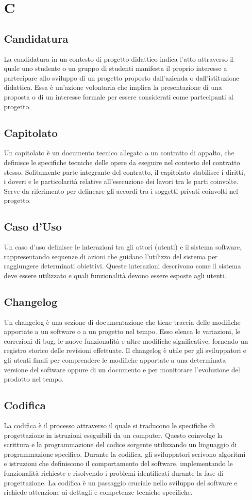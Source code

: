 \section{C} 
\subsection{Candidatura} 
La candidatura in un contesto di progetto didattico indica l'atto attraverso il quale uno studente o un gruppo di studenti manifesta il proprio interesse a partecipare allo sviluppo di un progetto proposto dall'azienda o dall'istituzione didattica. Essa è un'azione volontaria che implica la presentazione di una proposta o di un interesse formale per essere considerati come partecipanti al progetto.
\subsection{Capitolato} 
Un capitolato è un documento tecnico allegato a un contratto di appalto, che definisce le specifiche tecniche delle opere da eseguire nel contesto del contratto stesso. Solitamente parte integrante del contratto, il capitolato stabilisce i diritti, i doveri e le particolarità relative all'esecuzione dei lavori tra le parti coinvolte. Serve da riferimento per delineare gli accordi tra i soggetti privati coinvolti nel progetto.
\subsection{Caso d'Uso} 
Un caso d'uso definisce le interazioni tra gli attori (utenti) e il sistema software, rappresentando sequenze di azioni che guidano l'utilizzo del sistema per raggiungere determinati obiettivi. Queste interazioni descrivono come il sistema deve essere utilizzato e quali funzionalità devono essere esposte agli utenti.
\subsection{Changelog} 
Un changelog è una sezione di documentazione che tiene traccia delle modifiche apportate a un software o a un progetto nel tempo. Esso elenca le variazioni, le correzioni di bug, le nuove funzionalità e altre modifiche significative, fornendo un registro storico delle revisioni effettuate. Il changelog è utile per gli sviluppatori e gli utenti finali per comprendere le modifiche apportate a una determinata versione del software oppure di un documento e per monitorare l'evoluzione del prodotto nel tempo.
\subsection{Codifica} 
La codifica è il processo attraverso il quale si traducono le specifiche di progettazione in istruzioni eseguibili da un computer. Questo coinvolge la scrittura e la programmazione del codice sorgente utilizzando un linguaggio di programmazione specifico. Durante la codifica, gli sviluppatori scrivono algoritmi e istruzioni che definiscono il comportamento del software, implementando le funzionalità richieste e risolvendo i problemi identificati durante la fase di progettazione. La codifica è un passaggio cruciale nello sviluppo del software e richiede attenzione ai dettagli e competenze tecniche specifiche.
